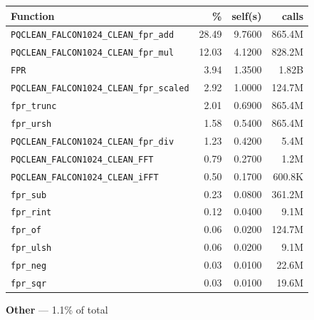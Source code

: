 \documentclass[11pt,a4paper]{article}
\begin{document}
\begin{longtable}{p{7.5cm}rrr}
\toprule
Function & \% & self(s) & calls \\
\midrule
\endhead
  \texttt{PQCLEAN\_FALCON1024\_CLEAN\_fpr\_add} & 28.49 & 9.7600 & 865.4M \\
  \texttt{PQCLEAN\_FALCON1024\_CLEAN\_fpr\_mul} & 12.03 & 4.1200 & 828.2M \\
  \texttt{FPR} & 3.94 & 1.3500 & 1.82B \\
  \texttt{PQCLEAN\_FALCON1024\_CLEAN\_fpr\_scaled} & 2.92 & 1.0000 & 124.7M \\
  \texttt{fpr\_trunc} & 2.01 & 0.6900 & 865.4M \\
  \texttt{fpr\_ursh} & 1.58 & 0.5400 & 865.4M \\
  \texttt{PQCLEAN\_FALCON1024\_CLEAN\_fpr\_div} & 1.23 & 0.4200 & 5.4M \\
  \texttt{PQCLEAN\_FALCON1024\_CLEAN\_FFT} & 0.79 & 0.2700 & 1.2M \\
  \texttt{PQCLEAN\_FALCON1024\_CLEAN\_iFFT} & 0.50 & 0.1700 & 600.8K \\
  \texttt{fpr\_sub} & 0.23 & 0.0800 & 361.2M \\
  \texttt{fpr\_rint} & 0.12 & 0.0400 & 9.1M \\
  \texttt{fpr\_of} & 0.06 & 0.0200 & 124.7M \\
  \texttt{fpr\_ulsh} & 0.06 & 0.0200 & 9.1M \\
  \texttt{fpr\_neg} & 0.03 & 0.0100 & 22.6M \\
  \texttt{fpr\_sqr} & 0.03 & 0.0100 & 19.6M \\
\bottomrule
\end{longtable}

\noindent\colorbox{othercolor}{\strut \textbf{Other} --- 1.1\% of total}
\vspace{2pt}
\end{document}
